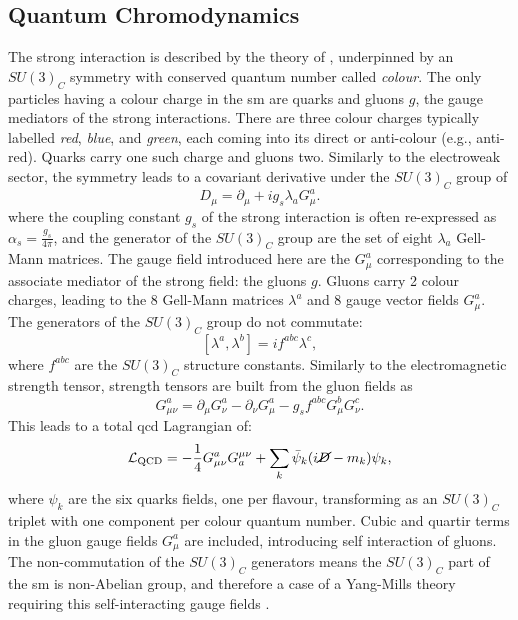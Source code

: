 \subsection{Quantum Chromodynamics}
The strong interaction is described by the theory of \textit{}, underpinned by an $SU(3)_C$ symmetry with conserved quantum number called \textit{colour}. The only particles having a colour charge in the \gls{sm} are quarks and gluons $g$, the gauge mediators of the strong interactions. There are three colour charges typically labelled \textit{red}, \textit{blue}, and \textit{green}, each coming into its direct or anti-colour (e.g., anti-red). Quarks carry one such charge and gluons two. Similarly to the electroweak sector, the symmetry leads to a covariant derivative under the $SU(3)_C$ group of
\begin{equation}\label{eq-GaugeQCD}
    D_{\mu}  = \partial_{\mu} + ig_s \lambda_a G_{\mu}^a. %
\end{equation}
where the coupling constant $g_s$ of the strong interaction is often re-expressed as $\alpha_s = \frac{g_s}{4\pi}$, and the generator of the $SU(3)_C$ group are the set of eight $\lambda_a$ Gell-Mann matrices. The gauge field introduced here are the $G_{\mu}^a$ corresponding to the associate mediator of the strong field: the gluons $g$. Gluons carry 2 colour charges, leading to the 8 Gell-Mann matrices $\lambda^a$ and 8 gauge vector fields $G_{\mu}^a$. The generators of the $SU(3)_C$ group do not commutate: \[ [\lambda^a, \lambda^b] = i f^{abc} \lambda^c,\] where $f^{abc}$ are the $SU(3)_C$ structure constants.  Similarly to the electromagnetic strength tensor, strength tensors are built from the gluon fields as \[G_{\mu\nu}^a = \partial_{\mu} G_{\nu}^a   - \partial_{\nu} G_{\mu}^a - g_s f^{abc} G_{\mu}^b G_{\nu}^c.\]
This leads to a total \gls{qcd} Lagrangian of:
\begin{equation}\label{eq-QCDLag}
    \mathcal{L}_{\text{QCD}} = -\frac{1}{4} G_{\mu\nu}^a G^{\mu\nu}_a + \sum_{k} \bar{\psi}_k (i \cancel{D} - m_k) \psi_k,
\end{equation}
where $\psi_k$ are the six quarks fields, one per flavour, transforming as an $SU(3)_C$ triplet with one component per colour quantum number. Cubic and quartir terms in the gluon gauge fields $G_{\mu}^a$ are included, introducing self interaction of gluons. The non-commutation of the $SU(3)_C$ generators means the $SU(3)_C$ part of the \gls{sm} is non-Abelian group, and therefore a case of a Yang-Mills theory requiring this self-interacting gauge fields \cite{PhysRev.96.191}. \\

